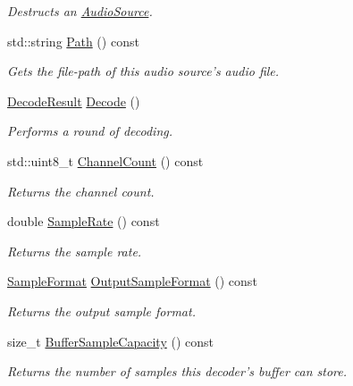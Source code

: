 \begin{DoxyCompactItemize}
\begin{DoxyCompactList}\small\item\em Destructs an \hyperlink{classAudioSource}{Audio\+Source}. \end{DoxyCompactList}\item 
std\+::string \hyperlink{classAudioSource_aea5c3828f1b22a9e103a5d56f9ffa5ec}{Path} () const 
\begin{DoxyCompactList}\small\item\em Gets the file-\/path of this audio source's audio file. \end{DoxyCompactList}\item 
\hyperlink{classAudioSource_aadbadeba50d982d09cfe0d1e05160ef9}{Decode\+Result} \hyperlink{classAudioSource_a6b5071168332523b68593bc47170f36f}{Decode} ()
\begin{DoxyCompactList}\small\item\em Performs a round of decoding. \end{DoxyCompactList}\item 
std\+::uint8\+\_\+t \hyperlink{classAudioSource_a267178b39a3a4d2fc86f41f6a96caf03}{Channel\+Count} () const 
\begin{DoxyCompactList}\small\item\em Returns the channel count. \end{DoxyCompactList}\item 
double \hyperlink{classAudioSource_aee0c4889919554f3c947a217f4436378}{Sample\+Rate} () const 
\begin{DoxyCompactList}\small\item\em Returns the sample rate. \end{DoxyCompactList}\item 
\hyperlink{sample__formats_8hpp_a21cca244e782ff3acc8805fb73236772}{Sample\+Format} \hyperlink{classAudioSource_aa6c567c4e2f3c6673d2a289d84aedae0}{Output\+Sample\+Format} () const 
\begin{DoxyCompactList}\small\item\em Returns the output sample format. \end{DoxyCompactList}\item 
size\+\_\+t \hyperlink{classAudioSource_af63c7249c1cf8d4ef86274ea2fdc1f26}{Buffer\+Sample\+Capacity} () const 
\begin{DoxyCompactList}\small\item\em Returns the number of samples this decoder's buffer can store. \end{DoxyCompactList}\item 

\end{DoxyCompactItemize}

